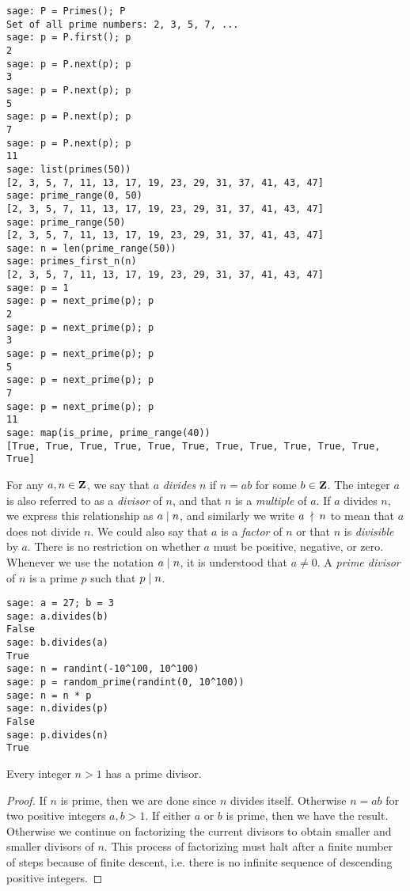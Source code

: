 \begin{lstlisting}
sage: P = Primes(); P
Set of all prime numbers: 2, 3, 5, 7, ...
sage: p = P.first(); p
2
sage: p = P.next(p); p
3
sage: p = P.next(p); p
5
sage: p = P.next(p); p
7
sage: p = P.next(p); p
11
sage: list(primes(50))
[2, 3, 5, 7, 11, 13, 17, 19, 23, 29, 31, 37, 41, 43, 47]
sage: prime_range(0, 50)
[2, 3, 5, 7, 11, 13, 17, 19, 23, 29, 31, 37, 41, 43, 47]
sage: prime_range(50)
[2, 3, 5, 7, 11, 13, 17, 19, 23, 29, 31, 37, 41, 43, 47]
sage: n = len(prime_range(50))
sage: primes_first_n(n)
[2, 3, 5, 7, 11, 13, 17, 19, 23, 29, 31, 37, 41, 43, 47]
sage: p = 1
sage: p = next_prime(p); p
2
sage: p = next_prime(p); p
3
sage: p = next_prime(p); p
5
sage: p = next_prime(p); p
7
sage: p = next_prime(p); p
11
sage: map(is_prime, prime_range(40))
[True, True, True, True, True, True, True, True, True, True, True, True]
\end{lstlisting}

For any $a,n \in \mathbf{Z}$, we say that $a$ \emph{divides}
$n$ if $n = ab$ for some $b \in \mathbf{Z}$. The integer $a$ is also referred
to as a \emph{divisor} of $n$, and that $n$ is a
\emph{multiple} of $a$. If $a$ divides $n$, we
express this relationship as $a \;|\; n$\index{$\divides$}, and
similarly we write $a \;\nmid\; n$\index{$\notdivides$} to mean that
$a$ does not divide $n$. We could also say that $a$ is a
\emph{factor} of $n$ or that $n$ is
\emph{divisible} by $a$. There is no restriction on
whether $a$ must be positive, negative, or zero. Whenever we use the
notation $a \;|\; n$, it is understood that $a \neq 0$. A
\emph{prime divisor} of $n$ is a prime $p$ such
that $p \;|\; n$.

\begin{lstlisting}
sage: a = 27; b = 3
sage: a.divides(b)
False
sage: b.divides(a)
True
sage: n = randint(-10^100, 10^100)
sage: p = random_prime(randint(0, 10^100))
sage: n = n * p
sage: n.divides(p)
False
sage: p.divides(n)
True
\end{lstlisting}

\begin{lemma}
\label{lem:unique_factorization:each_integer_greater_than_1_has_prime_divisor}
Every integer $n > 1$ has a prime divisor.
\end{lemma}

\begin{proof}
If $n$ is prime, then we are done since $n$ divides itself. Otherwise
$n = ab$ for two positive integers $a,b > 1$. If either $a$ or $b$ is
prime, then we have the result. Otherwise we continue on factorizing
the current divisors to obtain smaller and smaller divisors of
$n$. This process of factorizing must halt after a finite number of
steps because of finite descent, i.e. there is
no infinite sequence of descending positive integers.
\end{proof}

